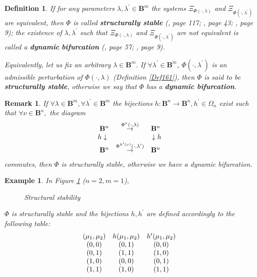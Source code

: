 \documentclass[12pt]{article}\usepackage{amsmath}
\newtheorem{definition}[theorem]{Definition}
\newtheorem{example}[theorem]{Example}
\newtheorem{remark}[theorem]{Remark}
\begin{document}
\begin{definition}
If for any parameters $\lambda,\lambda^{\prime}\in\mathbf{B}^{m}$ the systems
$\Xi_{\Phi(\cdot,\lambda)}$ and $\Xi_{\Phi(\cdot,\lambda^{\prime})}$ are
equivalent, then $\Phi$ is called \textbf{structurally stable} (\cite{bib6},
page 117; \cite{bib2}, page 43; \cite{bib5}, page 9); the existence of
$\lambda,\lambda^{\prime}$ such that $\Xi_{\Phi(\cdot,\lambda)}$ and
$\Xi_{\Phi(\cdot,\lambda^{\prime})}$ are not equivalent is called a
\textbf{dynamic} \textbf{bifurcation} (\cite{bib1}, page 57; \cite{bib5}, page 9).

Equivalently, let us fix an arbitrary $\lambda\in\mathbf{B}^{m}.$ If
$\forall\lambda^{\prime}\in\mathbf{B}^{m}$, $\Phi(\cdot,\lambda^{\prime})$ is
an admissible perturbation of $\Phi(\cdot,\lambda)$ (Definition \ref{Def161}),
then $\Phi$ is said to be \textbf{structurally stable}, otherwise we say that
$\Phi$ has a \textbf{dynamic bifurcation}.
\end{definition}

\begin{remark}
If $\forall\lambda\in\mathbf{B}^{m},\forall\lambda^{\prime}\in\mathbf{B}^{m}$
the bijections $h:\mathbf{B}^{n}\rightarrow\mathbf{B}^{n},h^{\prime}\in
\Omega_{n}$ exist such that $\forall\nu\in\mathbf{B}^{n},$ the diagram\[\begin{array}
[c]{ccc}\;\;\mathbf{B}^{n} & \overset{\Phi^{\nu}(\cdot,\lambda)}{\rightarrow} &
\mathbf{B}^{n}\;\\
h\downarrow &  & \downarrow h\\
\;\;\mathbf{B}^{n} & \overset{\Phi^{h^{\prime}(\nu)}(\cdot,\lambda^{\prime})}{\rightarrow} & \mathbf{B}^{n}\;
\end{array}
\]
commutes, then $\Phi$ is structurally stable, otherwise we have a dynamic bifurcation.
\end{remark}

\begin{example}
In Figure \ref{bifurcation3} ($n=2,m=1$),
\begin{figure}
[ptb]
\begin{center}
\caption{Structural stability}\label{bifurcation3}\end{center}
\end{figure}
$\Phi$ is structurally stable and the bijections $h,h^{\prime}$ are defined
accordingly to the following table:\[\begin{array}
[c]{ccc}(\mu_{1},\mu_{2}) & h(\mu_{1},\mu_{2}) & h^{\prime}(\mu_{1},\mu_{2})\\
(0,0) & (0,1) & (0,0)\\
(0,1) & (1,1) & (1,0)\\
(1,0) & (0,0) & (0,1)\\
(1,1) & (1,0) & (1,1)
\end{array}
\]

\end{example}
\end{document}
